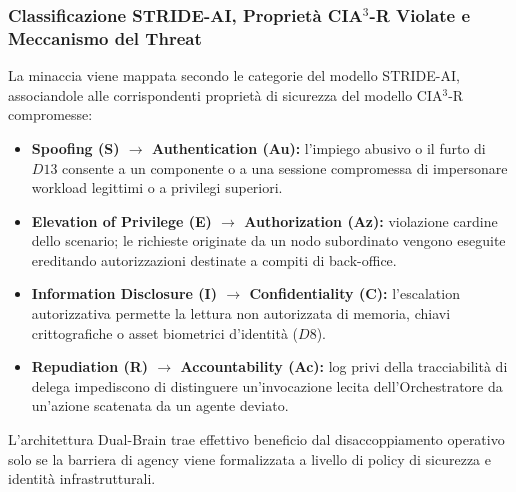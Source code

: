 \documentclass[11pt,a4paper]{article}
\begin{document}
\subsubsection{Classificazione STRIDE-AI, Proprietà CIA$^3$-R Violate e Meccanismo del Threat}

La minaccia viene mappata secondo le categorie del modello STRIDE-AI, associandole alle
corrispondenti proprietà di sicurezza del modello CIA$^3$-R compromesse:

\begin{itemize}
    \item \textbf{Spoofing (S) $\to$ Authentication (Au):} l'impiego abusivo o il furto di $D13$ consente a un componente o a una sessione compromessa di impersonare workload legittimi o a privilegi superiori.
    \item \textbf{Elevation of Privilege (E) $\to$ Authorization (Az):} violazione cardine dello scenario; le richieste originate da un nodo subordinato vengono eseguite ereditando autorizzazioni destinate a compiti di back-office.
    \item \textbf{Information Disclosure (I) $\to$ Confidentiality (C):} l'escalation autorizzativa permette la lettura non autorizzata di memoria, chiavi crittografiche o asset biometrici d'identità ($D8$).
    \item \textbf{Repudiation (R) $\to$ Accountability (Ac):} log privi della tracciabilità di delega impediscono di distinguere un'invocazione lecita dell'Orchestratore da un'azione scatenata da un agente deviato.
\end{itemize}

L'architettura Dual-Brain trae effettivo beneficio dal disaccoppiamento operativo solo se la barriera di agency viene formalizzata a livello di policy di sicurezza e identità infrastrutturali.
\end{document}
